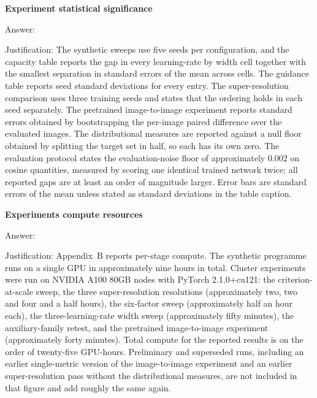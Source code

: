 \item {\bf Experiment statistical significance}
    \item[] Answer: \answerYes{}
    \item[] Justification: The synthetic sweeps use five seeds per configuration, and the
    capacity table reports the gap in every learning-rate by width cell together with the
    smallest separation in standard errors of the mean across cells. The guidance table reports
    seed standard deviations for every entry. The super-resolution comparison uses three training
    seeds and states that the ordering holds in each seed separately. The pretrained
    image-to-image experiment reports standard errors obtained by bootstrapping the per-image
    paired difference over the evaluated images. The distributional measures are reported against
    a null floor obtained by splitting the target set in half, so each has its own zero. The
    evaluation protocol states the evaluation-noise floor of approximately $0.002$ on cosine
    quantities, measured by scoring one identical trained network twice; all reported gaps are at
    least an order of magnitude larger. Error bars are standard errors of the mean unless stated
    as standard deviations in the table caption.

\item {\bf Experiments compute resources}
    \item[] Answer: \answerYes{}
    \item[] Justification: Appendix~B reports per-stage compute. The synthetic programme runs on
    a single GPU in approximately nine hours in total. Cluster experiments were run on NVIDIA
    A100 80GB nodes with PyTorch 2.1.0+cu121: the criterion-at-scale sweep, the three
    super-resolution resolutions (approximately two, two and four and a half hours), the
    six-factor sweep (approximately half an hour each), the three-learning-rate width sweep
    (approximately fifty minutes), the auxiliary-family retest, and the pretrained
    image-to-image experiment (approximately forty minutes). Total compute for the reported
    results is on the order of twenty-five GPU-hours. Preliminary and superseded runs, including
    an earlier single-metric version of the image-to-image experiment and an earlier
    super-resolution pass without the distributional measures, are not included in that figure
    and add roughly the same again.

